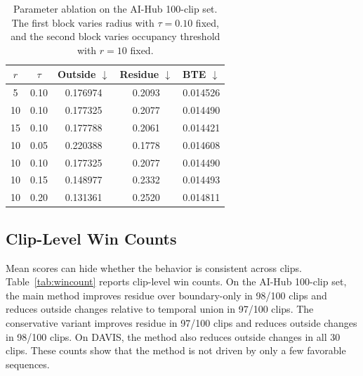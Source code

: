 \documentclass[nouppercase]{kaia}
\begin{document}
\begin{table}[h]
\begin{center}
\begin{tabular}{|c|c|c|c|c|}
\hline
$r$ & $\tau$ & Outside $\downarrow$ & Residue $\downarrow$ & BTE $\downarrow$ \\
\hline\hline
5 & 0.10 & 0.176974 & 0.2093 & 0.014526 \\
10 & 0.10 & 0.177325 & 0.2077 & 0.014490 \\
15 & 0.10 & 0.177788 & 0.2061 & 0.014421 \\
\hline
10 & 0.05 & 0.220388 & 0.1778 & 0.014608 \\
10 & 0.10 & 0.177325 & 0.2077 & 0.014490 \\
10 & 0.15 & 0.148977 & 0.2332 & 0.014493 \\
10 & 0.20 & 0.131361 & 0.2520 & 0.014811 \\
\hline
\end{tabular}
\end{center}
\caption{Parameter ablation on the AI-Hub 100-clip set. The first block varies radius with $\tau=0.10$ fixed, and the second block varies occupancy threshold with $r=10$ fixed.}
\label{tab:param_ablation}
\end{table}
\subsection{Clip-Level Win Counts}
Mean scores can hide whether the behavior is consistent across clips. Table~\ref{tab:wincount} reports clip-level win counts. On the AI-Hub 100-clip set, the main method improves residue over boundary-only in 98/100 clips and reduces outside changes relative to temporal union in 97/100 clips. The conservative variant improves residue in 97/100 clips and reduces outside changes in 98/100 clips. On DAVIS, the method also reduces outside changes in all 30 clips. These counts show that the method is not driven by only a few favorable sequences.

\begin{table}[h]
\begin{center}
\end{center}
\caption{Clip-level win counts. ``Gap'' counts clips where the residue gap against temporal union is larger than 0.10, which indicates a limitation of selective expansion.}
\label{tab:wincount}
\end{table}
\end{document}
